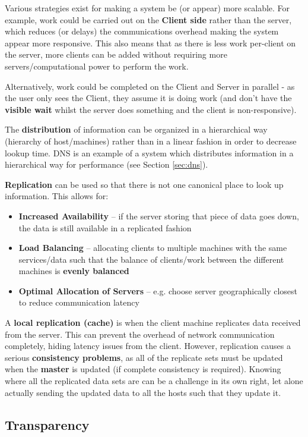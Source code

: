 \documentclass{article}
\begin{document}
Various strategies exist for making a system be (or appear) more scalable. For example, work could be carried out on the \textbf{Client side} rather than the server, which reduces (or delays) the communications overhead making the system appear more responsive. This also means that as there is less work per-client on the server, more clients can be added without requiring more servers/computational power to perform the work.

Alternatively, work could be completed on the Client and Server in parallel - as the user only sees the Client, they assume it is doing work (and don't have the \textbf{visible wait} whilst the server does something and the client is non-responsive).

The \textbf{distribution} of information can be organized in a hierarchical way (hierarchy of host/machines) rather than in a linear fashion in order to decrease lookup time. DNS is an example of a system which distributes information in a hierarchical way for performance (see Section \ref{sec:dns}).

\textbf{Replication} can be used so that there is not one canonical place to look up information. This allows for:
\begin{itemize}
	\item \textbf{Increased Availability} -- if the server storing that piece of data goes down, the data is still available in a replicated fashion
	\item \textbf{Load Balancing} -- allocating clients to multiple machines with the same services/data such that the balance of clients/work between the different machines is \textbf{evenly balanced}
	\item \textbf{Optimal Allocation of Servers} -- e.g. choose server geographically closest to reduce communication latency
\end{itemize}
A \textbf{local replication (cache)} is when the client machine replicates data received from the server. This can prevent the overhead of network communication completely, hiding latency issues from the client. However, replication causes a serious \textbf{consistency problems}, as all of the replicate sets must be updated when the \textbf{master} is updated (if complete consistency is required). Knowing where all the replicated data sets are can be a challenge in its own right, let alone actually sending the updated data to all the hosts such that they update it.

\subsection{Transparency}
\end{document}
